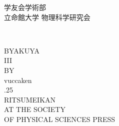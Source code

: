 \documentclass[11pt,b5paper,papersize,dvipdfmx]{jsbook}
\begin{document}
\begin{minipage}{0.88\hsize}
\begin{center}
    \vspace{-2zw}
    {\fontsize{13}{0}\selectfont \gt 学友会学術部}\\
    \vspace{0.2zw}
    {\fontsize{13}{0}\selectfont \gt 立命館大学 物理科学研究会}
  \end{center}
\end{minipage}
%

\newpage 
\quad \thispagestyle{empty}
\newpage

%
\begin{minipage}{0.07\hsize}
  \quad
\end{minipage}
%
\begin{minipage}{0.88\hsize}
  \tt %
  \begin{center}
    {\fontsize{50}{0}\selectfont \rm BYAKUYA}\\
    \vspace{3zw}
    {\fontsize{40}{0}\selectfont \rm III}\\
    \vspace{15zw}
    {\fontsize{16}{0}\selectfont BY}\\
    \vspace{0.5zw}
    {\fontsize{18}{0}\selectfont vuccaken}\\
    \vspace{6zw}
    {\fontsize{15}{0}.25}\\
    \vspace{6zw}
    {\fontsize{15}{0}\selectfont RITSUMEIKAN}\\
    \vspace{3zw}
    {\fontsize{15}{0}\selectfont AT THE SOCIETY}\\
    \vspace{0.5zw}
    {\fontsize{15}{0}\selectfont OF PHYSICAL SCIENCES PRESS}\\
  \end{center}
  \thispagestyle{empty}
\end{minipage}

\newpage 
\quad \thispagestyle{empty}
\newpage
\end{document}
